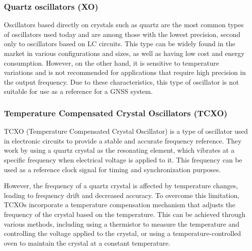 \subsubsection{Quartz oscillators (XO)}


Oscillators based directly on crystals such as quartz are the most common types of oscillators used today and are among those with the lowest precision, second only to oscillators based on LC circuits. This type can be widely found in the market in various configurations and sizes, as well as having low cost and energy consumption. However, on the other hand, it is sensitive to temperature variations and is not recommended for applications that require high precision in the output frequency. Due to these characteristics, this type of oscillator is not suitable for use as a reference for a GNSS system.

\subsubsection{Temperature Compensated Crystal Oscillators (TCXO)}

TCXO (Temperature Compensated Crystal Oscillator) is a type of oscillator used in electronic circuits to provide a stable and accurate frequency reference. They work by using a quartz crystal as the resonating element, which vibrates at a specific frequency when electrical voltage is applied to it. This frequency can be used as a reference clock signal for timing and synchronization purposes.

However, the frequency of a quartz crystal is affected by temperature changes, leading to frequency drift and decreased accuracy. To overcome this limitation, TCXOs incorporate a temperature compensation mechanism that adjusts the frequency of the crystal based on the temperature. This can be achieved through various methods, including using a thermistor to measure the temperature and controlling the voltage applied to the crystal, or using a temperature-controlled oven to maintain the crystal at a constant temperature.

